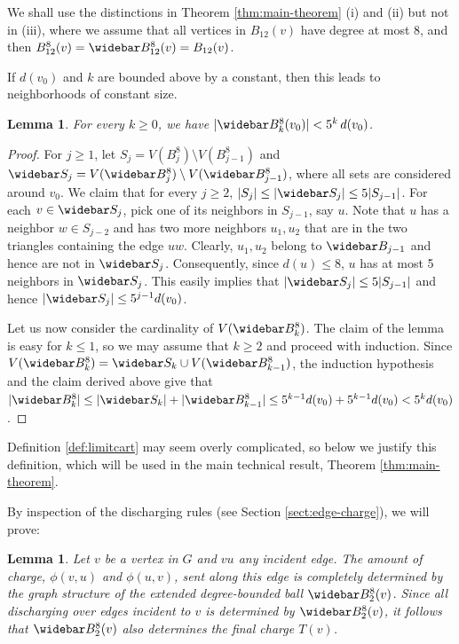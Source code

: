 \documentclass[10pt,a4paper]{article}
\newtheorem{lem}[thm]{Lemma}
\renewcommand{\bar}{\widebar}
\def\showlabel#1{}
\begin{document}
We shall use the distinctions in Theorem \ref{thm:main-theorem} (i) and (ii) but not in (iii), where we assume that all vertices in $B_{12}(v)$ have degree at most 8, and then $B^8_{12}(v)=\bar B^8_{12}(v)=B_{12}(v)$. 

If $d(v_0)$ and $k$ are bounded above by a constant, then this leads to neighborhoods of constant size.

\begin{lem}\label{lem:ball-size}\showlabel{lem:ball-size} 
For every $k\ge0$, we have $|\bar B^8_k(v_0)| < 5^k\, d(v_0)$.  
\end{lem}

\begin{proof}
  For $j\ge1$, let $S_j = V(B_j^8)\setminus V(B_{j-1}^8)$ and $\bar S_j = V(\bar B_j^8)\setminus V(\bar B_{j-1}^8)$, where all sets are considered around $v_0$. We claim that for every $j\ge2$, $|S_j|\le |\bar S_j| \le 5|S_{j-1}|$. For each $v\in \bar S_j$, pick one of its neighbors in $S_{j-1}$, say $u$. Note that $u$ has a neighbor $w\in S_{j-2}$ and has two more neighbors $u_1,u_2$ that are in the two triangles containing the edge $uw$. Clearly, $u_1,u_2$ belong to $\bar B_{j-1}$ and hence are not in $\bar S_j$. Consequently, since $d(u)\le8$, $u$ has at most 5 neighbors in $\bar S_j$. This easily implies that $|\bar S_j| \le 5|S_{j-1}|$ and hence $|\bar S_j| \le 5^{j-1} d(v_0)$.
  
  Let us now consider the cardinality of $V(\bar B_k^8)$. The claim of the lemma is easy for $k\le1$, so we may assume that $k\ge2$ and proceed with induction. Since $V(\bar B_k^8) = \bar S_k \cup V(\bar B_{k-1}^8)$, the induction hypothesis and the claim derived above give that $|\bar B_k^8| \le |\bar S_k| + |\bar B_{k-1}^8| \le 5^{k-1}d(v_0) + 5^{k-1}d(v_0) < 5^kd(v_0)$.
\end{proof}

Definition \ref{def:limitcart} may seem overly complicated, so below we justify this definition, which will be used in the main technical result, Theorem \ref{thm:main-theorem}. 

By inspection of the discharging rules (see Section \ref{sect:edge-charge}), we will prove:

\begin{lem}\label{limitcartwheel}\showlabel{limitcartwheel}
Let $v$ be a vertex in $G$ and $vu$ any incident edge. The amount of charge, $\phi(v,u)$ and $\phi(u, v)$, sent along this edge is completely determined by the graph structure of the extended degree-bounded ball $\bar B_2^8(v)$. Since all discharging over edges incident to $v$ is determined by $\bar B_2^8(v)$, it follows that $\bar B_2^8(v)$ also determines the final charge $T(v)$.
\end{lem}
\end{document}
